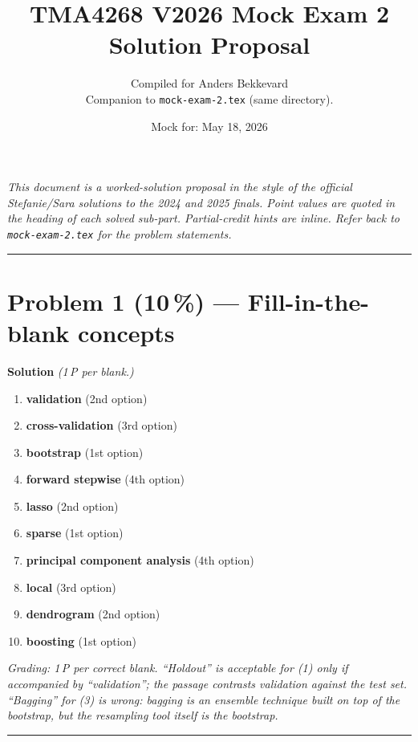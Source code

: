 \documentclass[11pt,a4paper]{article}
\title{TMA4268 V2026 Mock Exam 2\\[0.3em]
\large Solution Proposal}
\author{Compiled for Anders Bekkevard\\[0.2em]
\small Companion to \texttt{mock-exam-2.tex} (same directory).}
\date{Mock for: May 18, 2026}
\newcommand{\points}[1]{\textbf{(#1\,\%)}}
\newcommand{\sol}{\noindent\textbf{Solution}}
\begin{document}
\maketitle

\noindent\textit{This document is a worked-solution proposal in the style of the official Stefanie/Sara solutions
to the 2024 and 2025 finals. Point values are quoted in the heading of each solved sub-part. Partial-credit
hints are inline. Refer back to \texttt{mock-exam-2.tex} for the problem statements.}

\vspace{0.6em}
\hrule
\vspace{1em}

\section*{Problem 1 \points{10} --- Fill-in-the-blank concepts}

\sol{} \emph{(1\,P per blank.)}

\begin{enumerate}[(1)]
  \item \textbf{validation} (2nd option)
  \item \textbf{cross-validation} (3rd option)
  \item \textbf{bootstrap} (1st option)
  \item \textbf{forward stepwise} (4th option)
  \item \textbf{lasso} (2nd option)
  \item \textbf{sparse} (1st option)
  \item \textbf{principal component analysis} (4th option)
  \item \textbf{local} (3rd option)
  \item \textbf{dendrogram} (2nd option)
  \item \textbf{boosting} (1st option)
\end{enumerate}

\noindent\emph{Grading: 1\,P per correct blank. ``Holdout'' is acceptable for (1) only if accompanied by
``validation''; the passage contrasts validation against the test set. ``Bagging'' for (3) is wrong:
bagging is an \emph{ensemble} technique built on top of the bootstrap, but the resampling tool itself
is the bootstrap.}

\vspace{0.6em}
\hrule
\vspace{1em}
\end{document}
